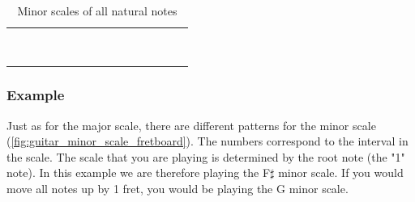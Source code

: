 \begin{table}[h]
	\centering
	\begin{NiceTabular}{*{16}{P{0.05mm}}}
		\Block{}{} &  & &  & &  & &  & &  & &  & &  & & \Block{}{} \\
		 & &  & &  & &  & &  & &  & &  & &  & \\
		 & &  & &  & &  & &  & &  & &  & &  & \\
		 & &  & &  & &  & &  & &  & &  & &  & \\
		 & &  & &  & &  & &  & &  & &  & &  & \\
		 & &  & &  & &  & &  & &  & &  & &  & \\
		 & &  & &  & &  & &  & &  & &  & &  & \\
		 & &  & &  & &  & &  & &  & &  & &  & \\
		 & &  & &  & &  & &  & &  & &  & &  & 
	\end{NiceTabular}
	\caption{Minor scales of all natural notes}
	\label{tab:guitar_natural_note_minor_scale}
\end{table}

\newpage

\subsubsection{Example}

Just as for the major scale, there are different patterns for the minor scale (\autoref{fig:guitar_minor_scale_fretboard}). The numbers correspond to the interval in the scale. The scale that you are playing is determined by the root note (the "1" note). In this example we are therefore playing the F$\sharp$ minor scale. If you would move all notes up by 1 fret, you would be playing the G minor scale.

